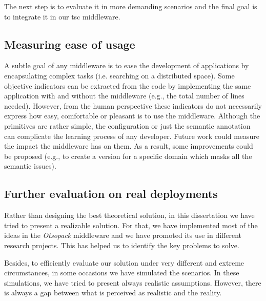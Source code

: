 The next step is to evaluate it in more demanding scenarios and the final goal is to integrate it in our \ac{tsc} middleware.




\subsection{Measuring ease of usage}

A subtle goal of any middleware is to ease the development of applications by encapsulating complex tasks (i.e. searching on a distributed space).
Some objective indicators can be extracted from the code by implementing the same application with and without the middleware (e.g., the total number of lines needed).
However, from the human perspective these indicators do not necessarily express how easy, comfortable or pleasant is to use the middleware.
Although the primitives are rather simple, the configuration or just the semantic annotation can complicate the learning process of any developer.
Future work could measure the impact the middleware has on them.
As a result, some improvements could be proposed (e.g., to create a version for a specific domain which masks all the semantic issues).


\subsection{Further evaluation on real deployments}

Rather than designing the best theoretical solution, in this dissertation we have tried to present a realizable solution.
For that, we have implemented most of the ideas in the \emph{Otsopack} middleware and we have promoted its use in different research projects.
This has helped us to identify the key problems to solve.

Besides, to efficiently evaluate our solution under very different and extreme circumstances, in some occasions we have simulated the scenarios. %
In these simulations, we have tried to present always realistic assumptions.
However, there is always a gap between what is perceived as realistic and the reality.

